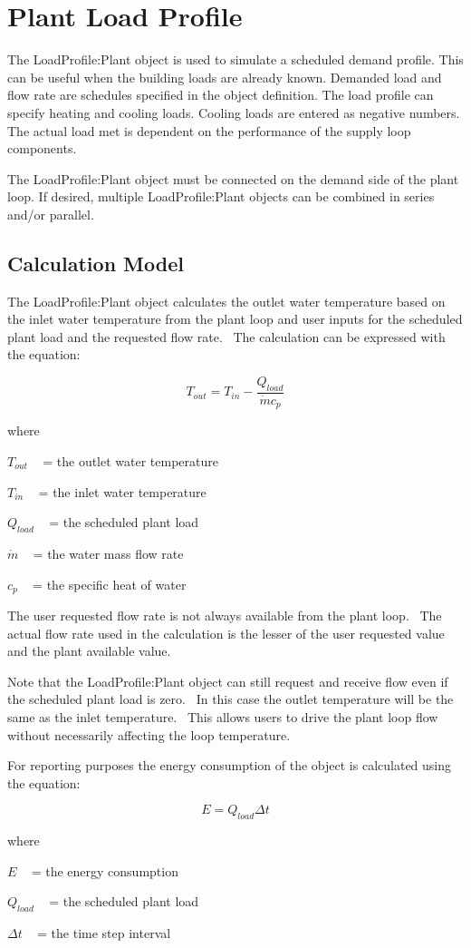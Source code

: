 \section{Plant Load Profile}\label{plant-load-profile}

The LoadProfile:Plant object is used to simulate a scheduled demand profile. This can be useful when the building loads are already known. Demanded load and flow rate are schedules specified in the object definition. The load profile can specify heating and cooling loads. Cooling loads are entered as negative numbers. The actual load met is dependent on the performance of the supply loop components.

The LoadProfile:Plant object must be connected on the demand side of the plant loop. If desired, multiple LoadProfile:Plant objects can be combined in series and/or parallel.

\subsection{Calculation Model}\label{calculation-model}

The LoadProfile:Plant object calculates the outlet water temperature based on the inlet water temperature from the plant loop and user inputs for the scheduled plant load and the requested flow rate.~ The calculation can be expressed with the equation:

\begin{equation}
{T_{out}} = {T_{in}} - \frac{{{Q_{load}}}}{{\dot m{c_p}}}
\end{equation}

where

\({T_{out}}\) ~ = the outlet water temperature

\({T_{in}}\) ~ = the inlet water temperature

\({Q_{load}}\) ~ = the scheduled plant load

\(\dot m\) ~ = the water mass flow rate

\({c_p}\) ~ = the specific heat of water

The user requested flow rate is not always available from the plant loop.~ The actual flow rate used in the calculation is the lesser of the user requested value and the plant available value.

Note that the LoadProfile:Plant object can still request and receive flow even if the scheduled plant load is zero.~ In this case the outlet temperature will be the same as the inlet temperature.~ This allows users to drive the plant loop flow without necessarily affecting the loop temperature.

For reporting purposes the energy consumption of the object is calculated using the equation:

\begin{equation}
E = {Q_{load}}\Delta t
\end{equation}

where

\(E\) ~ = the energy consumption

\({Q_{load}}\) ~ = the scheduled plant load

\(\Delta t\) ~ = the time step interval
